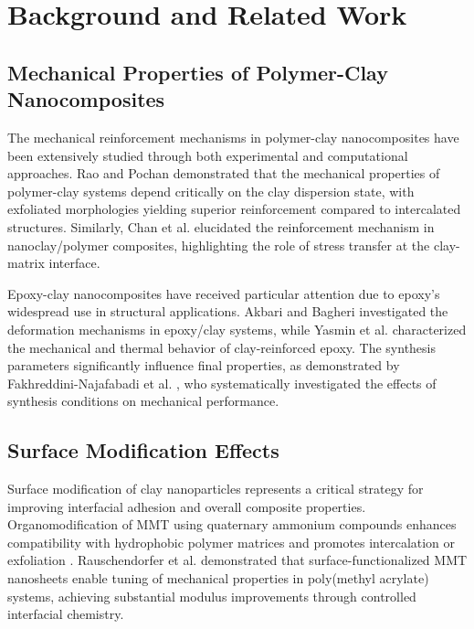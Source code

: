 \documentclass[conference]{IEEEtran}
\begin{document}
\section{Background and Related Work}

\subsection{Mechanical Properties of Polymer-Clay Nanocomposites}

The mechanical reinforcement mechanisms in polymer-clay nanocomposites have been extensively studied through both experimental and computational approaches. Rao and Pochan \cite{rao2007mechanics} demonstrated that the mechanical properties of polymer-clay systems depend critically on the clay dispersion state, with exfoliated morphologies yielding superior reinforcement compared to intercalated structures. Similarly, Chan et al. \cite{chan2011mechanism} elucidated the reinforcement mechanism in nanoclay/polymer composites, highlighting the role of stress transfer at the clay-matrix interface.

Epoxy-clay nanocomposites have received particular attention due to epoxy's widespread use in structural applications. Akbari and Bagheri \cite{akbari2007deformation} investigated the deformation mechanisms in epoxy/clay systems, while Yasmin et al. \cite{yasmin2006mechanical} characterized the mechanical and thermal behavior of clay-reinforced epoxy. The synthesis parameters significantly influence final properties, as demonstrated by Fakhreddini-Najafabadi et al. \cite{fakhreddini2021investigation}, who systematically investigated the effects of synthesis conditions on mechanical performance.

\subsection{Surface Modification Effects}

Surface modification of clay nanoparticles represents a critical strategy for improving interfacial adhesion and overall composite properties. Organomodification of MMT using quaternary ammonium compounds enhances compatibility with hydrophobic polymer matrices and promotes intercalation or exfoliation \cite{sinha2005role}. Rauschendorfer et al. \cite{rauschendorfer2020tuning} demonstrated that surface-functionalized MMT nanosheets enable tuning of mechanical properties in poly(methyl acrylate) systems, achieving substantial modulus improvements through controlled interfacial chemistry.
\end{document}

